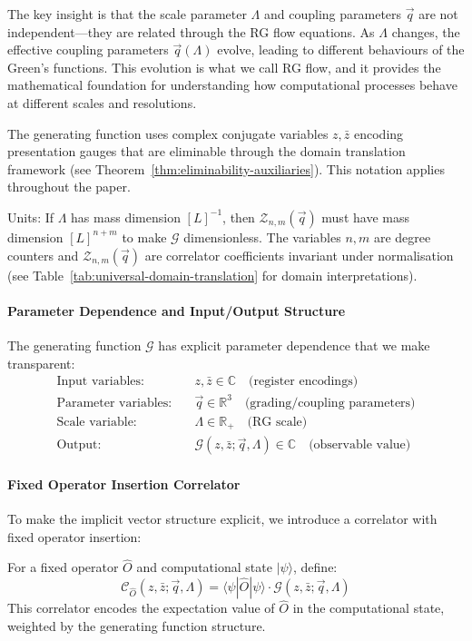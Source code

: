 The key insight is that the scale parameter $\Lambda$ and coupling parameters $\vec{q}$ are not independent—they are related through the RG flow equations. As $\Lambda$ changes, the effective coupling parameters $\vec{q}(\Lambda)$ evolve, leading to different behaviours of the Green's functions. This evolution is what we call RG flow, and it provides the mathematical foundation for understanding how computational processes behave at different scales and resolutions.

\begin{notation}
\label{not:notation-rule}
The generating function uses complex conjugate variables $z, \bar{z}$ encoding presentation gauges that are eliminable through the domain translation framework (see Theorem~\ref{thm:eliminability-auxiliaries}). This notation applies throughout the paper.
\end{notation}

Units: If $\Lambda$ has mass dimension $[L]^{-1}$, then $\mathcal{Z}_{n,m}(\vec{q})$ must have mass dimension $[L]^{n+m}$ to make $\mathcal{G}$ dimensionless. The variables $n,m$ are degree counters and $\mathcal{Z}_{n,m}(\vec{q})$ are correlator coefficients invariant under normalisation (see Table~\ref{tab:universal-domain-translation} for domain interpretations).

\paragraph{Parameter Dependence and Input/Output Structure}
The generating function $\mathcal{G}$ has explicit parameter dependence that we make transparent:
\begin{align}
\text{Input variables:} \quad & z, \bar{z} \in \mathbb{C} \quad \text{(register encodings)} \\
\text{Parameter variables:} \quad & \vec{q} \in \mathbb{R}^3 \quad \text{(grading/coupling parameters)} \\
\text{Scale variable:} \quad & \Lambda \in \mathbb{R}_+ \quad \text{(RG scale)} \\
\text{Output:} \quad & \mathcal{G}(z,\bar{z};\vec{q},\Lambda) \in \mathbb{C} \quad \text{(observable value)}
\end{align}

\paragraph{Fixed Operator Insertion Correlator}
To make the implicit vector structure explicit, we introduce a correlator with fixed operator insertion:
\begin{definition}
\label{def:fixed-operator-correlator}
For a fixed operator $\hat{O}$ and computational state $|\psi\rangle$, define:
\[
\mathcal{C}_{\hat{O}}(z,\bar{z};\vec{q},\Lambda) = \langle\psi|\hat{O}|\psi\rangle \cdot \mathcal{G}(z,\bar{z};\vec{q},\Lambda)
\]
This correlator encodes the expectation value of $\hat{O}$ in the computational state, weighted by the generating function structure.
\end{definition}

